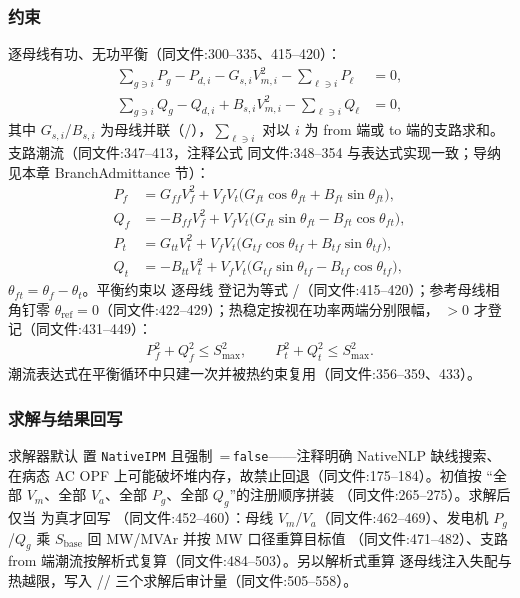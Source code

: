 \subsubsection*{约束}
逐母线有功、无功平衡（同文件:300--335、415--420）：
\begin{align*}
\sum_{g\ni i} P_g - P_{d,i} - G_{s,i}V_{m,i}^{2} - \sum_{\ell\ni i} P_{\ell} &= 0,\\
\sum_{g\ni i} Q_g - Q_{d,i} + B_{s,i}V_{m,i}^{2} - \sum_{\ell\ni i} Q_{\ell} &= 0,
\end{align*}
其中 $G_{s,i}$/$B_{s,i}$ 为母线并联（/），$\sum_{\ell\ni i}$
对以 $i$ 为 from 端或 to 端的支路求和。支路潮流（同文件:347--413，注释公式
同文件:348--354 与表达式实现一致；导纳见本章 BranchAdmittance 节）：
\begin{align*}
P_{f} &= G_{ff}V_f^{2} + V_fV_t\big(G_{ft}\cos\theta_{ft} + B_{ft}\sin\theta_{ft}\big),\\
Q_{f} &= -B_{ff}V_f^{2} + V_fV_t\big(G_{ft}\sin\theta_{ft} - B_{ft}\cos\theta_{ft}\big),\\
P_{t} &= G_{tt}V_t^{2} + V_fV_t\big(G_{tf}\cos\theta_{tf} + B_{tf}\sin\theta_{tf}\big),\\
Q_{t} &= -B_{tt}V_t^{2} + V_fV_t\big(G_{tf}\sin\theta_{tf} - B_{tf}\cos\theta_{tf}\big),
\end{align*}
$\theta_{ft}=\theta_f-\theta_t$。平衡约束以  逐母线
登记为等式 /（同文件:415--420）；参考母线相角钉零
$\theta_{\mathrm{ref}}=0$（同文件:422--429）；热稳定按视在功率两端分别限幅，
$>0$ 才登记（同文件:431--449）：
\begin{align*}
P_f^{2}+Q_f^{2}\le S_{\max}^{2},\qquad P_t^{2}+Q_t^{2}\le S_{\max}^{2}.
\end{align*}
潮流表达式在平衡循环中只建一次并被热约束复用（同文件:356--359、433）。

\subsubsection*{求解与结果回写}
求解器默认  置 \texttt{NativeIPM} 且强制
\,=\,\texttt{false}——注释明确 NativeNLP 缺线搜索、在病态
AC OPF 上可能破坏堆内存，故禁止回退（同文件:175--184）。初值按
“全部 $V_m$、全部 $V_a$、全部 $P_g$、全部 $Q_g$”的注册顺序拼装
（同文件:265--275）。求解后仅当  为真才回写
（同文件:452--460）：母线 $V_m$/$V_a$（同文件:462--469）、发电机 $P_g$/$Q_g$ 乘
$S_{\mathrm{base}}$ 回 MW/MVAr 并按 MW 口径重算目标值 
（同文件:471--482）、支路 from 端潮流按解析式复算（同文件:484--503）。另以解析式重算
逐母线注入失配与热越限，写入 //
 三个求解后审计量（同文件:505--558）。

